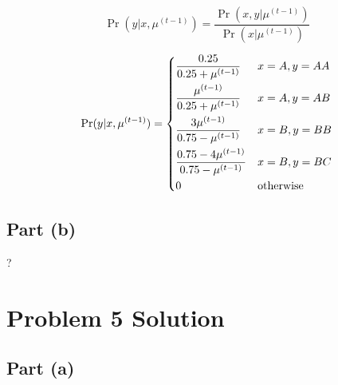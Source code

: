 \documentclass[11pt,a4paper,titlepage]{article}
\begin{document}
\[
    \Pr(y | x, \mu^{(t-1)}) = \frac{\Pr(x, y | \mu^{(t-1)})}{\Pr(x | \mu^{(t-1)})}
\]

\[
    \Pr(y | x, \mu^{(t-1)}) =
    \begin{dcases}
        \frac{0.25}{0.25 + \mu^{(t-1)}} & x = A, y = AA \\
        \frac{\mu^{(t-1)}}{0.25 + \mu^{(t-1)}} & x = A, y = AB \\
        \frac{3\mu^{(t-1)}}{0.75 - \mu^{(t-1)}} & x = B, y = BB \\
        \frac{0.75 - 4\mu^{(t-1)}}{0.75 - \mu^{(t-1)}} & x = B, y = BC \\
        0 & \rm otherwise
    \end{dcases}
\]

\subsection*{Part (b)}

?

\section*{Problem 5 Solution}

\subsection*{Part (a)}
\end{document}
